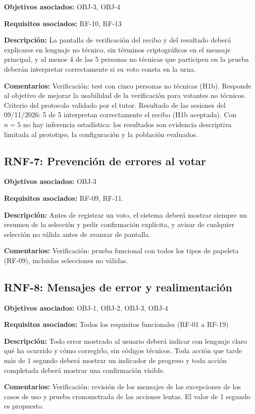 \textbf{Objetivos asociados:} OBJ-3, OBJ-4\par
\textbf{Requisitos asociados:} RF-10, RF-13\par
\textbf{Descripción:} La pantalla de verificación del recibo y del resultado deberá explicarse en lenguaje no técnico, sin términos criptográficos en el mensaje principal, y al menos 4 de las 5 personas no técnicas que participen en la prueba deberán interpretar correctamente si su voto consta en la urna.\par
\textbf{Comentarios:} Verificación: test con cinco personas no técnicas (H1b). Responde al objetivo de mejorar la usabilidad de la verificación para votantes no técnicos. Criterio del protocolo validado por el tutor. Resultado de las sesiones del 09/11/2026: 5 de 5 interpretan correctamente el recibo (H1b aceptada). Con $n = 5$ no hay inferencia estadística: los resultados son evidencia descriptiva limitada al prototipo, la configuración y la población evaluados.\par

\subsection{RNF-7: Prevención de errores al votar}

\textbf{Objetivos asociados:} OBJ-3\par
\textbf{Requisitos asociados:} RF-09, RF-11.\par
\textbf{Descripción:} Antes de registrar un voto, el sistema deberá mostrar siempre un resumen de la selección y pedir confirmación explícita, y avisar de cualquier selección no válida antes de avanzar de pantalla.\par
\textbf{Comentarios:} Verificación: prueba funcional con todos los tipos de papeleta (RF-09), incluidas selecciones no válidas.\par

\subsection{RNF-8: Mensajes de error y realimentación}

\textbf{Objetivos asociados:} OBJ-1, OBJ-2, OBJ-3, OBJ-4\par
\textbf{Requisitos asociados:} Todos los requisitos funcionales (RF-01 a RF-19)\par
\textbf{Descripción:} Todo error mostrado al usuario deberá indicar con lenguaje claro qué ha ocurrido y cómo corregirlo, sin códigos técnicos. Toda acción que tarde más de 1 segundo deberá mostrar un indicador de progreso y toda acción completada deberá mostrar una confirmación visible.\par
\textbf{Comentarios:} Verificación: revisión de los mensajes de las excepciones de los casos de uso y prueba cronometrada de las acciones lentas. El valor de 1 segundo es propuesto.\par

